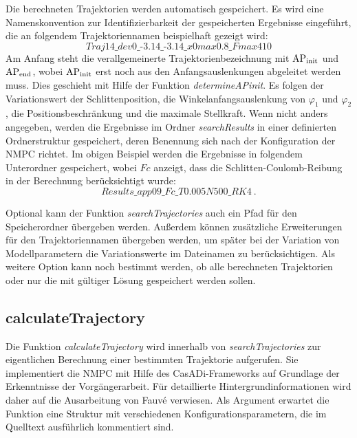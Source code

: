Die berechneten Trajektorien werden automatisch gespeichert. Es wird eine Namenskonvention zur Identifizierbarkeit der gespeicherten Ergebnisse eingeführt, die an folgendem Trajektoriennamen beispielhaft gezeigt wird:
	\[
	\textit{Traj14\_dev0\_-3.14\_-3.14\_x0max0.8\_Fmax410}
\]
Am Anfang steht die verallgemeinerte Trajektorienbezeichnung mit $\mathrm{AP_{init}}$ und $\mathrm{AP_{end}}$, wobei $\mathrm{AP_{init}}$ erst noch aus den Anfangsauslenkungen abgeleitet werden muss. Dies geschieht mit Hilfe der Funktion \textit{determineAPinit}. Es folgen der Variationswert der Schlittenposition, die Winkelanfangsauslenkung von $\varphi_1$ und $\varphi_2$, die Positionsbeschränkung und die maximale Stellkraft. 
Wenn nicht anders angegeben, werden die Ergebnisse im Ordner \textit{searchResults} in einer definierten Ordnerstruktur gespeichert, deren Benennung sich nach der Konfiguration der NMPC richtet. Im obigen Beispiel werden die Ergebnisse in folgendem Unterordner gespeichert, wobei $Fc$ anzeigt, dass die Schlitten-Coulomb-Reibung in der Berechnung berücksichtigt wurde: 
	\[
	\textit{Results\_app09\_Fc\_T0.005N500\_RK4} \ .
\]

Optional kann der Funktion \textit{searchTrajectories} auch ein Pfad für den Speicherordner übergeben werden. Außerdem können zusätzliche Erweiterungen für den Trajektoriennamen übergeben werden, um später bei der Variation von Modellparametern die Variationswerte im Dateinamen zu berücksichtigen. 
Als weitere Option kann noch bestimmt werden, ob alle berechneten Trajektorien oder nur die mit gültiger Lösung gespeichert werden sollen. 


\subsection{calculateTrajectory}\label{subsec:calctrj}

Die Funktion \textit{calculateTrajectory} wird innerhalb von \textit{searchTrajectories} zur eigentlichen Berechnung einer bestimmten Trajektorie aufgerufen. Sie implementiert die NMPC mit Hilfe des CasADi-Frameworks auf Grundlage der Erkenntnisse der Vorgängerarbeit. Für detaillierte Hintergrundinformationen wird daher auf die Ausarbeitung von Fauvé \cite{fauve} verwiesen. Als Argument erwartet die Funktion eine Struktur mit verschiedenen Konfigurationsparametern, die im Quelltext ausführlich kommentiert sind.


